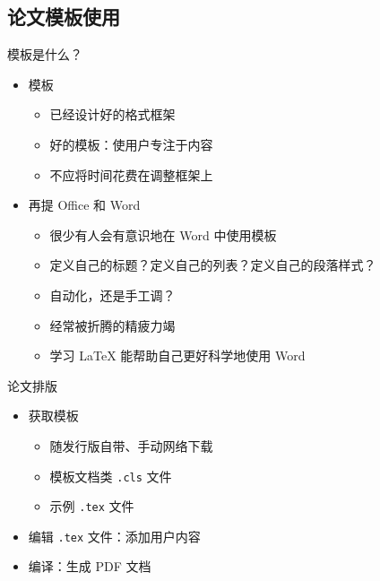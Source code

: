 \subsection{论文模板使用}

\begin{frame}{模板是什么？}
  \begin{itemize}
    \item 模板
      \begin{itemize}
        \item 已经设计好的格式框架
        \item 好的模板：使用户专注于内容
        \item 不应将时间花费在调整框架上
      \end{itemize}
    \item 再提 Office 和 Word
      \begin{itemize}
        \item 很少有人会有意识地在 Word 中使用模板
        \item 定义自己的标题？定义自己的列表？定义自己的段落样式？
        \item 自动化，还是手工调？
        \item 经常被折腾的精疲力竭
        \item 学习 \LaTeX{} 能帮助自己更好科学地使用 Word
      \end{itemize}
  \end{itemize}
\end{frame}

\begin{frame}{论文排版}
  \begin{itemize}
    \item 获取模板
      \begin{itemize}
        \item 随发行版自带、手动网络下载
        \item 模板文档类 \texttt{.cls} 文件
        \item 示例 \texttt{.tex} 文件
      \end{itemize}
    \item 编辑 \texttt{.tex} 文件：添加用户内容
    \item 编译：生成 PDF 文档
  \end{itemize}
\end{frame}

